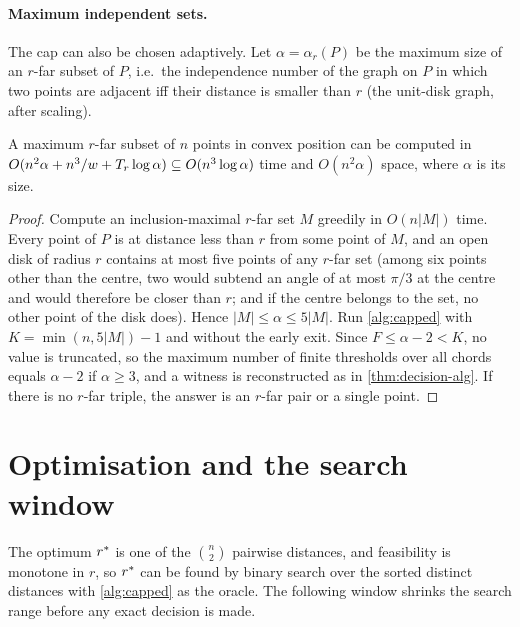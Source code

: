 \paragraph{Maximum independent sets.}
The cap can also be chosen adaptively. Let $\alpha=\alpha_r(P)$ be the maximum
size of an $r$-far subset of $P$, i.e.\ the independence number of the graph on
$P$ in which two points are adjacent iff their distance is smaller than $r$
(the unit-disk graph, after scaling).

\begin{corollary}\label{cor:mis}
A maximum $r$-far subset of $n$ points in convex position can be computed in
$O(n^2\alpha+n^3/w+T_r\log\alpha)\subseteq O(n^3\log\alpha)$ time and
$O(n^2\alpha)$ space, where $\alpha$ is its size.
\end{corollary}
\begin{proof}
Compute an inclusion-maximal $r$-far set $M$ greedily in $O(n|M|)$ time. Every
point of $P$ is at distance less than $r$ from some point of $M$, and an open
disk of radius $r$ contains at most five points of any $r$-far set (among six
points other than the centre, two would subtend an angle of at most $\pi/3$ at
the centre and would therefore be closer than $r$; and if the centre belongs
to the set, no other point of the disk does).
Hence $|M|\le\alpha\le5|M|$. Run \cref{alg:capped} with
$K=\min(n,5|M|)-1$ and without the early exit. Since $F\le\alpha-2<K$, no
value is truncated, so the maximum number of finite thresholds over all chords
equals $\alpha-2$ if $\alpha\ge3$, and a witness is reconstructed as in
\cref{thm:decision-alg}. If there is no $r$-far triple, the answer is an
$r$-far pair or a single point.
\end{proof}

\section{Optimisation and the search window}\label{sec:opt}

The optimum $r^{*}$ is one of the $\binom n2$ pairwise distances, and
feasibility is monotone in $r$, so $r^{*}$ can be found by binary search over
the sorted distinct distances with \cref{alg:capped} as the oracle. The
following window shrinks the search range before any exact decision is made.

